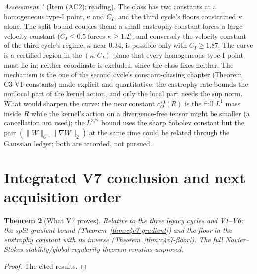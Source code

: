 \documentclass[11pt]{article}
\theoremstyle{plain}
\newtheorem{theorem}{Theorem}[section]
\theoremstyle{definition}
\theoremstyle{remark}
\newtheorem{assessment}[theorem]{Assessment}
\begin{document}
\begin{assessment}[Item (AC2): reading]
\label{ass:c4v7-reading}
The class has two constants at a homogeneous type-I point, \(\kappa\) and
\(C_I\), and the third cycle's floors constrained \(\kappa\) alone.  The split
bound couples them: a small enstrophy constant forces a large
velocity constant (\(C_I\le0.5\) forces \(\kappa\ge1.2\)), and conversely the velocity
constant of the third cycle's regime, \(\kappa\) near \(0.34\), is possible only
with \(C_I\ge1.87\).  The curve is a certified region in the \((\kappa,C_I)\)-plane
that every homogeneous type-I point must lie in; neither coordinate
is excluded, since the class fixes neither.  The mechanism is the
one of the second cycle's constant-chasing chapter (Theorem
C3-V1-constants) made explicit and quantitative: the enstrophy rate
bounds the nonlocal part of the kernel action, and only the local
part needs the sup norm.  What would sharpen the curve: the near
constant \(c_O^{s0}(R)\) is the full \(L^1\) mass inside \(R\) while the kernel's
action on a divergence-free tensor might be smaller (a cancellation
not used); the \(L^{3/2}\) bound uses the sharp Sobolev constant but the
pair \((\|W\|_6,\|\nabla W\|_2)\) at the same time could be related through the
Gaussian ledger; both are recorded, not pursued.
\end{assessment}

\section{Integrated V7 conclusion and next acquisition order}
\label{sec:c4v7-conclusion}

\begin{theorem}[What V7 proves]
\label{thm:c4v7-conclusion}
Relative to the three legacy cycles and V1--V6: the split gradient
bound (Theorem~\ref{thm:c4v7-gradient}) and the floor in the enstrophy
constant with its inverse (Theorem~\ref{thm:c4v7-floor}).  The full
Navier--Stokes stability/global-regularity theorem remains
unproved.
\end{theorem}

\begin{proof}
The cited results.
\end{proof}
\end{document}
